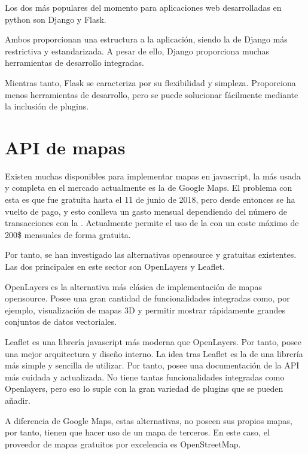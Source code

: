   Los dos  más populares del momento para aplicaciones web desarrolladas en python son Django\cite{django} y Flask\cite{flask}.
  
  Ambos proporcionan una estructura a la aplicación, siendo la de Django más restrictiva y estandarizada. A pesar de ello, Django proporciona muchas herramientas de desarrollo integradas.
  
  Mientras tanto, Flask se caracteriza por su flexibilidad y simpleza. Proporciona menos herramientas de desarrollo, pero se puede solucionar fácilmente mediante la inclusión de plugins.
  

\section{API de mapas}

  Existen muchas  disponibles para implementar mapas en javascript, la más usada y completa en el mercado actualmente es la de Google Maps\cite{gmaps}. El problema con esta  es que fue gratuita hasta el 11 de junio de 2018, pero desde entonces se ha vuelto de pago, y esto conlleva un gasto mensual dependiendo del número de transacciones con la . Actualmente permite el uso de la  con un coste máximo de 200\$ mensuales de forma gratuita.
  
  
  Por tanto, se han investigado las alternativas opensource y gratuitas existentes. Las dos  principales en este sector son OpenLayers\cite{openlayers} y Leaflet\cite{leaflet}.
  
  OpenLayers es la alternativa más clásica de implementación de mapas opensource. Posee una gran cantidad de funcionalidades integradas como, por ejemplo, visualización de mapas 3D y permitir mostrar rápidamente grandes conjuntos de datos vectoriales.
  
  Leaflet es una librería javascript más moderna que OpenLayers. Por tanto, posee una mejor arquitectura y diseño interno. La idea tras Leaflet es la de una librería más simple y sencilla de utilizar. Por tanto, posee una documentación de la API más cuidada y actualizada. No tiene tantas funcionalidades integradas como Openlayers, pero eso lo suple con la gran variedad de plugins que se pueden añadir.
  
  A diferencia de Google Maps, estas alternativas, no poseen sus propios mapas, por tanto, tienen que hacer uso de un mapa de terceros. En este caso, el proveedor de mapas gratuitos por excelencia es OpenStreetMap\cite{osm}.
